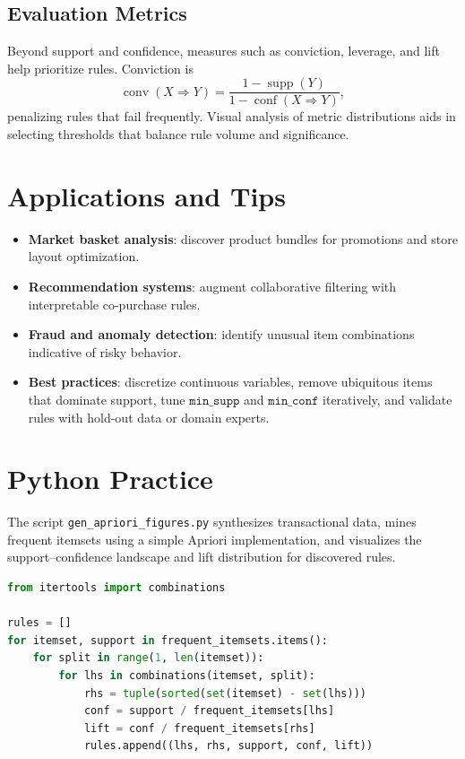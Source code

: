 ﻿\documentclass[12pt]{article}
\begin{document}
\subsection{Evaluation Metrics}
Beyond support and confidence, measures such as conviction, leverage, and lift help prioritize rules. Conviction is
\begin{equation}
\operatorname{conv}(X \Rightarrow Y) = \frac{1 - \operatorname{supp}(Y)}{1 - \operatorname{conf}(X \Rightarrow Y)},
\end{equation}
penalizing rules that fail frequently. Visual analysis of metric distributions aids in selecting thresholds that balance rule volume and significance.

\section{Applications and Tips}
\begin{itemize}
  \item \textbf{Market basket analysis}: discover product bundles for promotions and store layout optimization.
  \item \textbf{Recommendation systems}: augment collaborative filtering with interpretable co-purchase rules.
  \item \textbf{Fraud and anomaly detection}: identify unusual item combinations indicative of risky behavior.
  \item \textbf{Best practices}: discretize continuous variables, remove ubiquitous items that dominate support, tune \(\texttt{min\_supp}\) and \(\texttt{min\_conf}\) iteratively, and validate rules with hold-out data or domain experts.
\end{itemize}

\section{Python Practice}
The script \texttt{gen\_apriori\_figures.py} synthesizes transactional data, mines frequent itemsets using a simple Apriori implementation, and visualizes the support--confidence landscape and lift distribution for discovered rules.
\begin{lstlisting}[language=Python,caption={Excerpt from gen_apriori_figures.py}]
from itertools import combinations

rules = []
for itemset, support in frequent_itemsets.items():
    for split in range(1, len(itemset)):
        for lhs in combinations(itemset, split):
            rhs = tuple(sorted(set(itemset) - set(lhs)))
            conf = support / frequent_itemsets[lhs]
            lift = conf / frequent_itemsets[rhs]
            rules.append((lhs, rhs, support, conf, lift))
\end{lstlisting}
\end{document}

